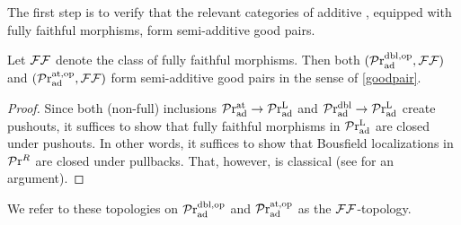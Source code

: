 \documentclass[a4paper,10pt, oneside]{amsart}
\begin{document}
	The first step is to verify that the relevant categories of additive \infcats, equipped with fully faithful morphisms, form semi-additive good pairs.
	\begin{prop}\label{dualaddsaddpair}
	Let $\mathcal{F}\mathcal{F}$ denote the class of fully faithful morphisms. Then both $(\mathcal{P}\mathrm{r}_{\mathrm{ad}}^{\mathrm{dbl,op}},\mathcal{F}\mathcal{F})$ and $(\mathcal{P}\mathrm{r}_{\mathrm{ad}}^{\mathrm{at,op}},\mathcal{F}\mathcal{F})$ form semi-additive good pairs in the sense of \cref{goodpair}.
	\end{prop}
	\begin{proof}
		Since both (non-full) inclusions $\mathcal{P}\mathrm{r}_{\mathrm{ad}}^{\mathrm{at}}\to \mathcal{P}\mathrm{r}_{\mathrm{ad}}^\mathrm{L}$ and $\mathcal{P}\mathrm{r}_{\mathrm{ad}}^{\mathrm{dbl}}\to\mathcal{P}\mathrm{r}_{\mathrm{ad}}^\mathrm{L}$ create pushouts, it suffices to show that fully faithful morphisms in $\mathcal{P}\mathrm{r}_{\mathrm{ad}}^\mathrm{L}$ are closed under pushouts. In other words, it suffices to show that Bousfield localizations in $\mathcal{P}\mathrm{r}^R$ are closed under pullbacks. That, however, is classical (see \cite[Lemma 2.7]{ramzi2025every} for an argument).
	\end{proof}

	\begin{de}\label{dfn:fftopology}
		We refer to these topologies on $\mathcal{P}\mathrm{r}_{\mathrm{ad}}^{\mathrm{dbl,op}}$ and $\mathcal{P}\mathrm{r}_{\mathrm{ad}}^{\mathrm{at,op}}$ as the $\mathcal{F}\mathcal{F}$-topology. 
	\end{de}
	
\end{document}
